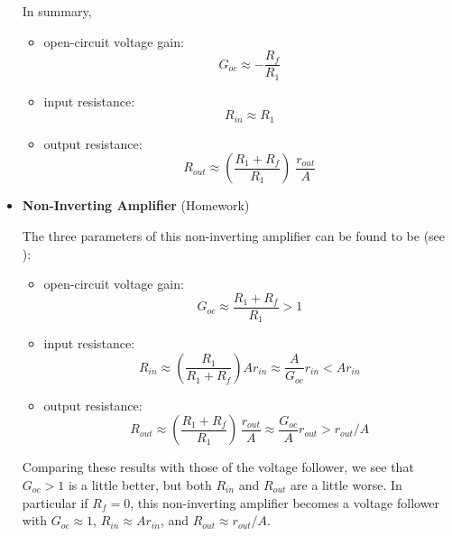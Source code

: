 \documentclass{article}
\begin{document}
\begin{itemize}
\begin{itemize}
\begin{itemize}
      \end{itemize}
  \end{itemize}

  In summary,
  \begin{itemize}
  \item open-circuit voltage gain:
    \begin{equation}
      G_{oc}\approx -\frac{R_f}{R_1}
    \end{equation}
  \item input resistance:
    \begin{equation}
      R_{in}\approx R_1
    \end{equation}
  \item output resistance:
    \begin{equation}
      R_{out}\approx \left(\frac{R_1+R_f}{R_1}\right)\;\frac{r_{out}}{A}
    \end{equation}
  \end{itemize}


\item {\bf Non-Inverting Amplifier} (Homework)


  The three parameters of this non-inverting amplifier can be found 
  to be (see 
  ):
  \begin{itemize}
    \item open-circuit voltage gain:
      \begin{equation}
        G_{oc} \approx \frac{R_1+R_f}{R_1}>1
      \end{equation}
    \item input resistance:
      \begin{equation}
        R_{in} \approx \left(\frac{R_1}{R_1+R_f}\right)A r_{in}
        \approx\frac{A}{G_{oc}}r_{in}<A r_{in}
      \end{equation}
    \item output resistance:
      \begin{equation}
        R_{out}\approx \left(\frac{R_1+R_f}{R_1} \right)\,\frac{r_{out}}{A} 
        \approx\frac{G_{oc}}{A}r_{out}>r_{out}/A
      \end{equation}
  \end{itemize}
  Comparing these results with those of the voltage follower, we see 
  that $G_{oc}>1$ is a little better, but both $R_{in}$ and $R_{out}$ are 
  a little worse. In particular if $R_f=0$, this non-inverting amplifier
  becomes a voltage follower with $G_{oc}\approx 1$, $R_{in}\approx Ar_{in}$,
  and $R_{out}\approx r_{out}/A$.

\end{itemize}
\end{document}
